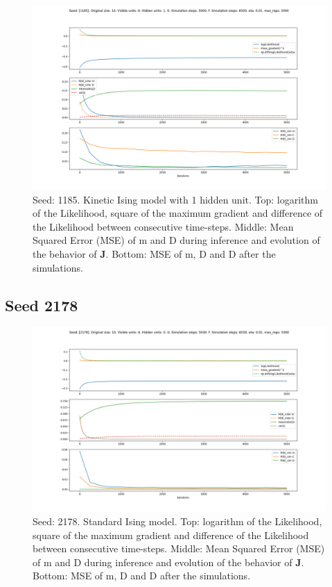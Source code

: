 \documentclass{article}
\def\*#1{\mathbf{#1}}
\begin{document}
\begin{figure}[!htb]
    \centering
    \includegraphics[width=0.8\linewidth]{images/sqrt_size/[1185]_10_6_1_5000_6500_eta001_5000_100.png}
\caption{Seed: 1185. Kinetic Ising model with 1 hidden unit. Top: logarithm of the Likelihood, square of the maximum gradient and difference of the Likelihood between consecutive time-steps. Middle: Mean Squared Error (MSE) of m and D during inference and evolution of the behavior of $\*J$. Bottom: MSE of m, D and D after the simulations.}
\end{figure}


\newpage
\subsection{Seed 2178}

\begin{figure}[!htb]
    \centering
    \includegraphics[width=0.8\linewidth]{images/sqrt_size/[2178]_10_6_0_5000_6500_eta001_5000_100.png}
\caption{Seed: 2178. Standard Ising model. Top: logarithm of the Likelihood, square of the maximum gradient and difference of the Likelihood between consecutive time-steps. Middle: Mean Squared Error (MSE) of m and D during inference and evolution of the behavior of $\*J$. Bottom: MSE of m, D and D after the simulations.}
\end{figure}
\end{document}
